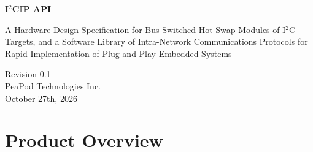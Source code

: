 \documentclass{../tex/report}
\begin{document}
\begin{titlepage}
    \begin{center}
        \vspace*{1.2cm}

        \textbf{\large{I${}^2$CIP API}}

        \vspace{0.5cm}

        A Hardware Design Specification for Bus-Switched Hot-Swap Modules of I${}^2$C Targets, and a Software Library of Intra-Network Communications Protocols for Rapid Implementation of Plug-and-Play Embedded Systems

        \vfill
        
        \vspace{1.25cm}

        Revision 0.1\\
        PeaPod Technologies Inc.\\
        October 27th, 2026

    \end{center}
\end{titlepage}

\thispagestyle{plain}

\tableofcontents
\clearpage

\section{Product Overview}







\end{document}
